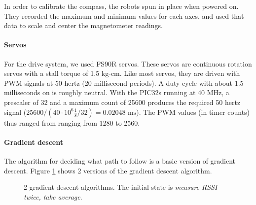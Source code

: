 \documentclass[]{article}
\let\oldparagraph\paragraph
\renewcommand{\paragraph}[1]{\oldparagraph{#1}\mbox{}}
\begin{document}
In order to calibrate the compass, the robots spun in place when powered
on.
They recorded the maximum and minimum values for each axes, and used
that data to scale and center the magnetometer readings.

\paragraph{Servos}

For the drive system, we used FS90R servos.
These servos are continuous rotation servos with a stall torque of 1.5 kg-cm.
Like most servos, they are driven with PWM signals at 50 hertz (20 millisecond periods).
A duty cycle with about 1.5 milliseconds on is roughly neutral.
With the PIC32s running at 40 MHz, a prescaler of 32 and a maximum count of 25600 produces the required 50 hertz signal ($25600/\left(40\cdot 10^6 \frac{1}{\text{s}}/ 32 \right) = 0.02048 \text{ ms}$).
The PWM values (in timer counts) thus ranged from ranging from 1280 to 2560.

\paragraph{Gradient descent}

The algorithm for deciding what path to follow is a basic version of
gradient descent. Figure \ref{fig:graddesc} shows 2 versions of the gradient descent algorithm.

\begin{figure}
  \centering
  \caption{2 gradient descent algorithms. The initial state is \emph{measure RSSI twice, take average}.}
  \label{fig:graddesc}
\end{figure}
\end{document}
